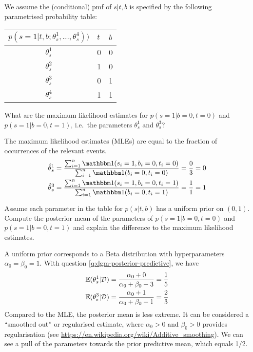 We assume the (conditional) pmf of $s|t,b$ is specified by the following
parametrised probability table:
\begin{center}
  \begin{tabular}{@{}cll@{}}
    \toprule
    $p(s=1 | t, b; \theta^1_s, \ldots, \theta_s^4))$ & $t$ & $b$\\
    \midrule
    $\theta^1_s$ & 0 & 0\\
    $\theta^2_s$ & 1 & 0\\
    $\theta^3_s$ & 0 & 1\\
    $\theta^4_s$ & 1 & 1\\
    \bottomrule
  \end{tabular}
\end{center}

  \begin{exenumerate}
  \item What are the maximum likelihood estimates for $p(s=1 | b=0,
    t=0)$ and $p(s=1 | b=0, t=1)$, i.e.\ the parameters $\theta^1_s$
    and $\theta^3_s$?
    
    \begin{solution}
      The maximum likelihood estimates (MLEs) are equal to the fraction of occurrences of the relevant events.
      \begin{align}
        \hat{\theta}^1_s & =\frac{\sum_{i=1}^n \ind(s_i=1, b_i=0, t_i=0)}{\sum_{i=1}^n \ind(b_i=0, t_i=0)} = \frac{0}{3} = 0\\
        \hat{\theta}^3_s & =\frac{\sum_{i=1}^n \ind(s_i=1, b_i=0, t_i=1)}{\sum_{i=1}^n \ind(b_i=0, t_i=1)} = \frac{1}{1} = 1
      \end{align}

    \end{solution}
    
  \item Assume each parameter in the table for $p(s | t,b)$ has a
    uniform prior on $(0,1)$. Compute the posterior mean of the
    parameters of \mbox{$p(s=1 | b=0, t=0)$} and $p(s=1 | b=0, t=1)$
    and explain the difference to the maximum likelihood estimates.

    \begin{solution}
      A uniform prior corresponds to a Beta distribution with
      hyperparameters $\alpha_0=\beta_0=1$. With
       question
      \ref{q:dgm-posterior-predictive}, we have
      \begin{align}
        \mathbb{E}(\theta_s^1 | \mathcal{D}) & = \frac{\alpha_0+0}{\alpha_0+\beta_0+3} = \frac{1}{5}\\
        \mathbb{E}(\theta_s^3 | \mathcal{D}) & = \frac{\alpha_0+1}{\alpha_0+\beta_0+1} = \frac{2}{3}
      \end{align}
      Compared to the MLE, the posterior mean is less extreme. It can
      be considered a ``smoothed out'' or regularised estimate, where
      $\alpha_0 >0$ and $\beta_0>0$ provides regularisation (see
      \url{https://en.wikipedia.org/wiki/Additive_smoothing}). We can
      see a pull of the parameters towards the prior predictive mean,
      which equals 1/2.

    \end{solution}
    
  \end{exenumerate}
  
